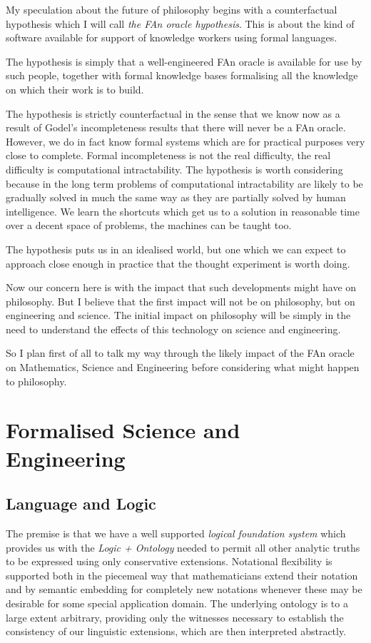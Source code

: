 My speculation about the future of philosophy begins with a counterfactual hypothesis which I will call {\it the FAn oracle hypothesis}.
This is about the kind of software available for support of knowledge workers using formal languages.

The hypothesis is simply that a well-engineered FAn oracle is available for use by such people, together with formal knowledge bases formalising all the knowledge on which their work is to build.

The hypothesis is strictly counterfactual in the sense that we know now as a result of Godel's incompleteness results that there will never be a FAn oracle.
However, we do in fact know formal systems which are for practical purposes very close to complete.
Formal incompleteness is not the real difficulty, the real difficulty is computational intractability.
The hypothesis is worth considering because in the long term problems of computational intractability are likely to be gradually solved in much the same way as they are partially solved by human intelligence.
We learn the shortcuts which get us to a solution in reasonable time over a decent space of problems, the machines can be taught too.

The hypothesis puts us in an idealised world, but one which we can expect to approach close enough in practice that the thought experiment is worth doing.

Now our concern here is with the impact that such developments might have on philosophy.
But I believe that the first impact will not be on philosophy, but on engineering and science.
The initial impact on philosophy will be simply in the need to understand the effects of this technology on science and engineering.

So I plan first of all to talk my way through the likely impact of the FAn oracle on Mathematics, Science and Engineering before considering what might happen to philosophy.

\section{Formalised Science and Engineering}
\subsection{Language and Logic}

The premise is that we have a well supported {\it logical foundation system} which provides us with the {\it Logic + Ontology} needed to permit all other analytic truths to be expressed using only conservative extensions.
Notational flexibility is supported both in the piecemeal way that mathematicians extend their notation and by semantic embedding for completely new notations whenever these may be desirable for some special application domain.
The underlying ontology is to a large extent arbitrary, providing only the witnesses necessary to establish the consistency of our linguistic extensions, which are then interpreted abstractly.

